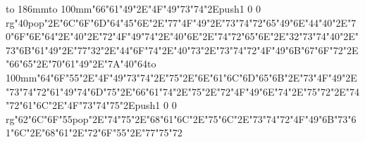 \hbox to 186mm{\hsize=81mm\vbox to 100mm{\vfill\ipa\char"66\ipa\char"61\ipa\char"49\ipa\char"2E\ipa\char"4F\ipa\char"49\ipa\char"73\ipa\char"74\ipa\char"2E\pdfcolorstack\match push{1 0 0 rg}\ipa\char"40\pdfcolorstack\match pop{}\ipa\char"2E\ipa\char"6C\ipa\char"6F\ipa\char"6D\medskip\ipa\char"64\ipa\char"45\ipa\char"6E\ipa\char"2E\ipa\char"77\ipa\char"4F\ipa\char"49\ipa\char"2E\ipa\char"73\ipa\char"74\ipa\char"72\ipa\char"65\ipa\char"49\ipa\char"6E\medskip\ipa\char"44\ipa\char"40\ipa\char"2E\ipa\char"70\ipa\char"6F\ipa\char"6E\ipa\char"64\ipa\char"2E\ipa\char"40\ipa\char"2E\ipa\char"72\ipa\char"4F\ipa\char"49\ipa\char"74\ipa\char"2E\ipa\char"40\ipa\char"6E\ipa\char"2E\ipa\char"74\ipa\char"72\ipa\char"65\ipa\char"6E\ipa\char"2E\ipa\char"32\ipa\char"73\ipa\char"74\medskip\ipa\char"40\ipa\char"2E\ipa\char"73\ipa\char"6B\ipa\char"61\ipa\char"49\ipa\char"2E\ipa\char"77\ipa\char"32\ipa\char"2E\ipa\char"44\ipa\char"6F\ipa\char"74\ipa\char"2E\ipa\char"40\ipa\char"73\ipa\char"2E\ipa\char"73\ipa\char"74\ipa\char"72\ipa\char"4F\ipa\char"49\ipa\char"6B\medskip\ipa\char"67\ipa\char"6F\ipa\char"72\ipa\char"2E\ipa\char"66\ipa\char"65\ipa\char"2E\ipa\char"70\ipa\char"61\ipa\char"49\ipa\char"2E\ipa\char"7A\ipa\char"40\ipa\char"64\vfill}\hfill\vbox to 100mm{\vfill\ipa\char"64\ipa\char"6F\ipa\char"55\ipa\char"2E\ipa\char"4F\ipa\char"49\ipa\char"73\ipa\char"74\ipa\char"2E\ipa\char"75\ipa\char"2E\ipa\char"6E\ipa\char"61\ipa\char"6C\medskip\ipa\char"6D\ipa\char"65\ipa\char"6B\ipa\char"2E\ipa\char"73\ipa\char"4F\ipa\char"49\ipa\char"2E\ipa\char"73\ipa\char"74\ipa\char"72\ipa\char"61\ipa\char"49\ipa\char"74\medskip\ipa\char"6D\ipa\char"75\ipa\char"2E\ipa\char"66\ipa\char"61\ipa\char"74\ipa\char"2E\ipa\char"75\ipa\char"2E\ipa\char"72\ipa\char"4F\ipa\char"49\ipa\char"6E\ipa\char"74\ipa\char"2E\ipa\char"75\ipa\char"72\ipa\char"2E\ipa\char"74\ipa\char"72\ipa\char"61\ipa\char"6C\ipa\char"2E\ipa\char"4F\ipa\char"73\ipa\char"74\medskip\ipa\char"75\ipa\char"2E\pdfcolorstack\match push{1 0 0 rg}\ipa\char"62\ipa\char"6C\ipa\char"6F\ipa\char"55\pdfcolorstack\match pop{}\ipa\char"2E\ipa\char"74\ipa\char"75\ipa\char"2E\ipa\char"68\ipa\char"61\ipa\char"6C\ipa\char"2E\ipa\char"75\ipa\char"6C\ipa\char"2E\ipa\char"73\ipa\char"74\ipa\char"72\ipa\char"4F\ipa\char"49\ipa\char"6B\medskip\ipa\char"73\ipa\char"61\ipa\char"6C\ipa\char"2E\ipa\char"68\ipa\char"61\ipa\char"2E\ipa\char"72\ipa\char"6F\ipa\char"55\ipa\char"2E\ipa\char"77\ipa\char"75\ipa\char"72\vfill}}\eject
